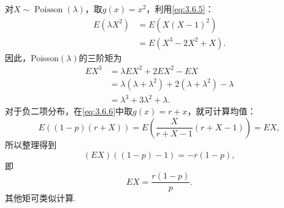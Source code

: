 \begin{example}[高阶Poisson矩]\label{ex:3.6.9}
对$X\sim\operatorname{Poisson}(\lambda)$，取$g(x)=x^2$，利用\eqref{eq:3.6.5}：
\begin{align*}
E(\lambda X^2)&=E(X(X-1)^2)\\
&=E(X^3-2X^2+X).
\end{align*}
因此，Poisson$(\lambda)$的三阶矩为
\begin{align*}
EX^3&=\lambda EX^2+2EX^2-EX\\
&=\lambda(\lambda+\lambda^2)+2(\lambda+\lambda^2)-\lambda\\
&=\lambda^3+3\lambda^2+\lambda.
\end{align*}
对于负二项分布，在\eqref{eq:3.6.6}中取$g(x)=r+x$，就可计算均值：
$$E((1-p)(r+X))=E\left(\frac X{r+X-1}(r+X-1)\right)=EX,$$
所以整理得到
$$(EX)((1-p)-1)=-r(1-p),$$
即
$$EX=\frac{r(1-p)}p.$$
其他矩可类似计算.
\end{example}
